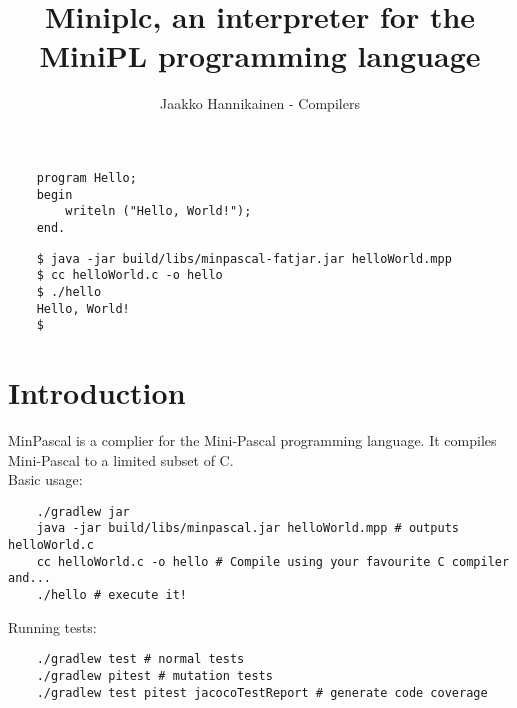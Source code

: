 \documentclass{article}
\author{Jaakko Hannikainen - Compilers}
\title{Miniplc, an interpreter for the MiniPL programming language}
\def\pascallexer{pascal.py:DelphiLexer -x}
\begin{document}
\maketitle

\noindent
\begin{minipage}{0.35\textwidth}
\begin{verbatim}
    program Hello;
    begin
        writeln ("Hello, World!");
    end.
\end{verbatim}
\end{minipage}
\begin{minipage}{0.54\textwidth}
\begin{verbatim}
    $ java -jar build/libs/minpascal-fatjar.jar helloWorld.mpp
    $ cc helloWorld.c -o hello
    $ ./hello
    Hello, World!
    $
\end{verbatim}
\end{minipage}

\section{Introduction}
MinPascal is a complier for the Mini-Pascal programming language. It
compiles Mini-Pascal to a limited subset of C. \\[1.5em]

\noindent
Basic usage:
\begin{verbatim}
    ./gradlew jar
    java -jar build/libs/minpascal.jar helloWorld.mpp # outputs helloWorld.c
    cc helloWorld.c -o hello # Compile using your favourite C compiler and...
    ./hello # execute it!
\end{verbatim}

\noindent
Running tests:
\begin{verbatim}
    ./gradlew test # normal tests
    ./gradlew pitest # mutation tests
    ./gradlew test pitest jacocoTestReport # generate code coverage
\end{verbatim}

\newpage
\end{document}
